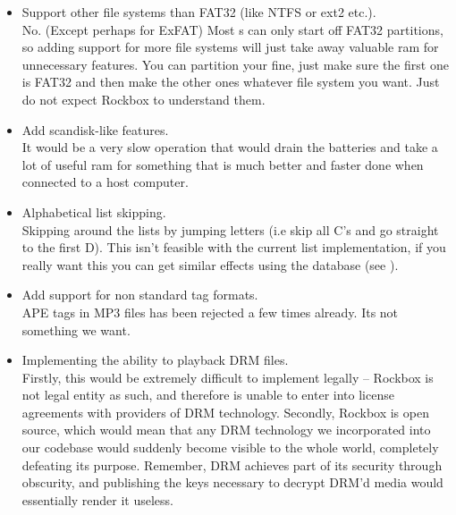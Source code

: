 \begin{itemize}
\item Support other file systems than FAT32 (like NTFS or ext2 etc.).\\
  No.  (Except perhaps for ExFAT)
  Most \dap{}s can only start off FAT32 partitions, so adding support
  for more file systems will just take away valuable ram for
  unnecessary features. You can partition your \dap{} fine, just make sure
  the first one is FAT32 and then make the other ones whatever file system
  you want. Just do not expect Rockbox to understand them.
\item Add scandisk{}-like features.\\
  It would be a very slow operation that would drain the batteries and
  take a lot of useful ram for something that is much better and faster
  done when connected to a host computer.
\item Alphabetical list skipping.\\
  Skipping around the lists by jumping letters (i.e skip all C's and go
  straight to the first D). This isn't feasible with the current list
  implementation, if you really want this you can get similar effects using
  the database (see ).
\item Add support for non standard tag formats.\\
APE tags in MP3 files has been rejected a few times already. Its not something we want.
\item Implementing the ability to playback DRM files.\\
  Firstly, this would be extremely difficult to implement legally -- Rockbox
  is not legal entity as such, and therefore is unable to enter into license
  agreements with providers of DRM technology.
  Secondly, Rockbox is open source, which would mean that any DRM technology we
  incorporated into our codebase would suddenly become visible to the whole world,
  completely defeating its purpose. Remember, DRM achieves part of its security
  through obscurity, and publishing the keys necessary to decrypt DRM'd 
  media would essentially render it useless.
\end{itemize}

